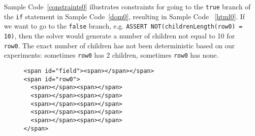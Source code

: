 Sample Code~\ref{constraints0} illustrates constraints for going to the {\tt true} branch of the {\tt if} statement in Sample Code~\ref{dom0}, resulting in Sample Code ~\ref{html0}.  
If we want to go to the {\tt false} branch, e.g. {\tt ASSERT NOT(childrenLength(row0) = 10)}, then the solver would generate a number of children not equal to 10 for {\tt row0}.  The exact number of children has not been deterministic based on our experiments: sometimes {\tt row0} has 2 children, sometimes {\tt row0} has none.  

\begin{figure}
\begin{lstlisting}[caption=Example HTML generated from the results of the DOM solver based on the constraints defined in Sample Code ~\ref{constraints0}.  Note that {\tt row0} is not a child of {\tt field} because the source code in Sample Code \ref{dom0} did not require the rows to be children of {\tt field}.,label=html0]  
<span id="field"><span></span></span>
<span id="row0">
  <span></span><span></span>
  <span></span><span></span>
  <span></span><span></span>
  <span></span><span></span>
  <span></span><span></span>
</span>
\end{lstlisting}
\end{figure}
